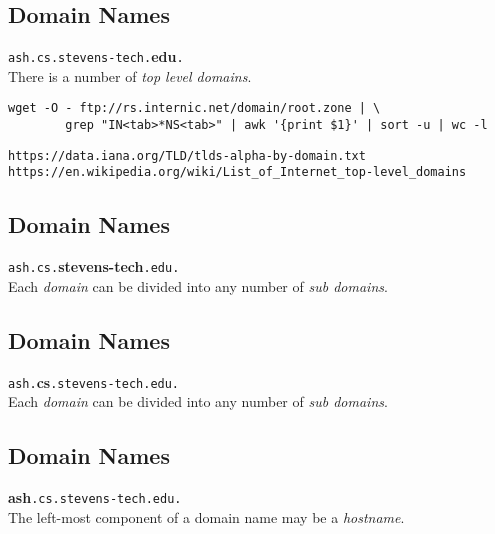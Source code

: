 \documentclass[xga]{xdvislides}
\begin{document}
\subsection{Domain Names}
\vspace{.5in}
\begin{center}
	\Huge
	\verb+ash.cs.stevens-tech.+{\bf edu}\verb+.+ \\
	\vspace{.5in}
	There is a number of {\em top level domains}. \\
	\vspace{.5in}
	\Normalsize
	\begin{verbatim}
wget -O - ftp://rs.internic.net/domain/root.zone | \
        grep "IN<tab>*NS<tab>" | awk '{print $1}' | sort -u | wc -l
\end{verbatim}
	\vspace{.25in}
	\verb+https://data.iana.org/TLD/tlds-alpha-by-domain.txt+ \\
	\verb+https://en.wikipedia.org/wiki/List_of_Internet_top-level_domains+
\end{center}
\Normalsize


\subsection{Domain Names}
\vspace{.5in}
\begin{center}
	\Huge
	\verb+ash.cs.+{\bf stevens-tech}\verb+.edu.+ \\
	\vspace{.5in}
	Each {\em domain} can be divided into any number of {\em sub domains}.
\end{center}
\Normalsize

\subsection{Domain Names}
\vspace{.5in}
\begin{center}
	\Huge
	\verb+ash.+{\bf cs}\verb+.stevens-tech.edu.+ \\
	\vspace{.5in}
	Each {\em domain} can be divided into any number of {\em sub domains}.
\end{center}
\Normalsize

\subsection{Domain Names}
\vspace{.5in}
\begin{center}
	\Huge
	{\bf ash}\verb+.cs.stevens-tech.edu.+ \\
	\vspace{.5in}
	The left-most component of a domain name may be a {\em hostname}.
\end{center}
\Normalsize
\end{document}
